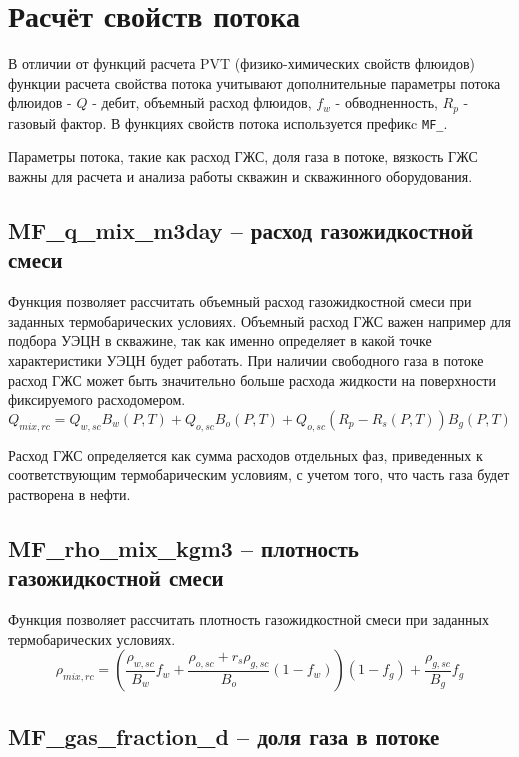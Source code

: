 \section{Расчёт свойств потока}

В отличии от функций расчета PVT (физико-химических свойств флюидов) функции расчета свойства потока учитывают дополнительные параметры потока флюидов - $Q$ - дебит, объемный расход флюидов, $f_w$ - обводненность, $R_p$ - газовый фактор. В функциях свойств потока используется префикc \texttt{MF_}.

Параметры потока, такие как расход ГЖС, доля газа в потоке, вязкость ГЖС важны для расчета и анализа работы скважин и скважинного оборудования.


\subsection{MF\_q\_mix\_m3day – расход газожидкостной смеси}

Функция позволяет рассчитать объемный расход газожидкостной смеси при заданных термобарических условиях. Объемный расход ГЖС важен например для подбора УЭЦН в скважине, так как именно определяет в какой точке характеристики УЭЦН будет работать. При наличии свободного газа в потоке расход ГЖС может быть значительно больше расхода жидкости на поверхности фиксируемого расходомером.
$$Q_{mix,rc} = Q_{w,sc} B_w(P,T) + Q_{o,sc} B_o(P,T)  + Q_{o,sc}  (R_p - R_s(P,T)) B_g(P,T) $$

Расход ГЖС определяется как сумма расходов отдельных фаз, приведенных к соответствующим термобарическим условиям, с учетом того, что часть газа будет растворена в нефти.


\subsection{MF\_rho\_mix\_kgm3 – плотность газожидкостной смеси}

Функция позволяет рассчитать плотность газожидкостной смеси при заданных термобарических условиях. 
$$\rho_{mix,rc} = \left( \frac{\rho_{w,sc}}{B_w} f_w + \frac{\rho_{o,sc} +r_s \rho_{g,sc} }{B_o}(1-f_w) \right) (1-f_g) + \frac{ \rho_{g,sc} }{B_g} f_g $$


\subsection{MF\_gas\_fraction\_d – доля газа в потоке}

